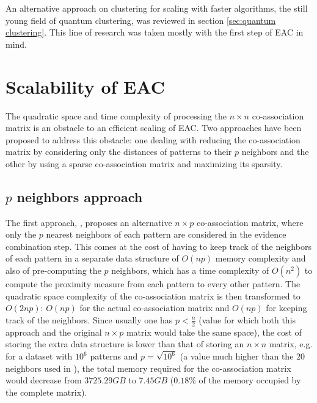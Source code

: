 An alternative approach on clustering for scaling with faster algorithms, the still young field of quantum clustering, was reviewed in section \ref{sec:quantum clustering}.
This line of research was taken mostly with the first step of EAC in mind.



%
%


\section{Scalability of EAC}
\label{sec:eac scaling}
The quadratic space and time complexity of processing the $n \times n$ co-association matrix is an obstacle to an efficient scaling of EAC.
Two approaches have been proposed to address this obstacle: one dealing with reducing the co-association matrix by considering only the distances of patterns to their $p$ neighbors and the other by using a sparse co-association matrix and maximizing its sparsity.

\subsection{$p$ neighbors approach}
The first approach, \cite{Fred2005}, proposes an alternative $n \times p$ co-association matrix, where only the $p$ nearest neighbors of each pattern are considered in the evidence combination step.
This comes at the cost of having to keep track of the neighbors of each pattern in a separate data structure of $O(np)$ memory complexity and also of pre-computing the $p$ neighbors, which has a time complexity of $O(n^2)$ to compute the proximity measure from each pattern to every other pattern.
The quadratic space complexity of the co-association matrix is then transformed to $O(2np)$: $O(np)$ for the actual co-association matrix and $O(np)$ for keeping track of the neighbors.
Since usually one has $p < \frac{n}{2}$ (value for which both this approach and the original $n \times p$ matrix would take the same space), the cost of storing the extra data structure is lower than that of storing an $n \times n$ matrix, e.g. for a dataset with $10^6$ patterns and $p=\sqrt{10^6}$ (a value much higher than the $20$ neighbors used in \cite{Fred2005}), the total memory required for the co-association matrix would decrease from $3725.29 GB$ to $7.45 GB$ ($0.18\%$ of the memory occupied by the complete matrix).

